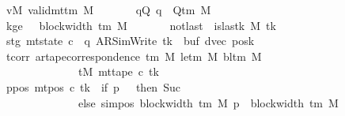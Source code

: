 \begin{isabellebody}
\ \ \ \ \ \ \ vM{\isacharcolon}{\kern0pt}\ {\isachardoublequoteopen}valid{\isacharunderscore}{\kern0pt}mttm\ M{\isachardoublequoteclose}\isanewline
\ \ \ \ \ \ \ qQ{\isacharcolon}{\kern0pt}\ {\isachardoublequoteopen}q\ {\isasymin}\ Q{\isacharunderscore}{\kern0pt}tm\ M{\isachardoublequoteclose}\isanewline
\ \ \ \ \ \ \ kge{}{\isacharcolon}{\kern0pt}\ {\isachardoublequoteopen}{}\ {\isasymle}\ block{\isacharunderscore}{\kern0pt}width\ {\isacharparenleft}{\kern0pt}{\isasymGamma}{\isacharunderscore}{\kern0pt}tm\ M{\isacharparenright}{\kern0pt}{\isachardoublequoteclose}\isanewline
\ \ \ \ \ \ \ notlast{\isacharcolon}{\kern0pt}\ {\isachardoublequoteopen}{\isasymnot}\ is{\isacharunderscore}{\kern0pt}last{\isacharunderscore}{\kern0pt}k\ M\ tk{\isachardoublequoteclose}\isanewline
\ \ \ \ \ \ \ stg{\isacharcolon}{\kern0pt}\ {\isachardoublequoteopen}mt{\isacharunderscore}{\kern0pt}state\ c{\isacharprime}{\kern0pt}\ {\isacharequal}{\kern0pt}\ {\isacharparenleft}{\kern0pt}q{\isacharcomma}{\kern0pt}\ AR{\isacharunderscore}{\kern0pt}SimWrite{\isacharcomma}{\kern0pt}\ tk{\isacharcomma}{\kern0pt}\ {}{\isacharcomma}{\kern0pt}\ buf{\isacharcomma}{\kern0pt}\ dvec{\isacharcomma}{\kern0pt}\ posk{\isacharparenright}{\kern0pt}{\isachardoublequoteclose}\isanewline
\ \ \ \ \ \ \ tcorr{\isacharcolon}{\kern0pt}\ {\isachardoublequoteopen}ar{\isacharunderscore}{\kern0pt}tape{\isacharunderscore}{\kern0pt}correspondence\ {\isacharparenleft}{\kern0pt}{\isasymGamma}{\isacharunderscore}{\kern0pt}tm\ M{\isacharparenright}{\kern0pt}\ {\isacharparenleft}{\kern0pt}le{\isacharunderscore}{\kern0pt}tm\ M{\isacharparenright}{\kern0pt}\ {\isacharparenleft}{\kern0pt}bl{\isacharunderscore}{\kern0pt}tm\ M{\isacharparenright}{\kern0pt}\isanewline
\ \ \ \ \ \ \ \ \ \ \ \ \ \ \ \ \ \ \ \ tM\ {\isacharparenleft}{\kern0pt}mt{\isacharunderscore}{\kern0pt}tape\ c{\isacharprime}{\kern0pt}\ tk{\isacharparenright}{\kern0pt}{\isachardoublequoteclose}\isanewline
\ \ \ \ \ \ \ ppos{\isacharcolon}{\kern0pt}\ {\isachardoublequoteopen}mt{\isacharunderscore}{\kern0pt}pos\ c{\isacharprime}{\kern0pt}\ tk\ {\isacharequal}{\kern0pt}\ {\isacharparenleft}{\kern0pt}if\ p\ {\isacharequal}{\kern0pt}\ {}\ then\ Suc\ {}\isanewline
\ \ \ \ \ \ \ \ \ \ \ \ \ \ \ \ \ \ \ \ else\ sim{\isacharunderscore}{\kern0pt}pos\ {\isacharparenleft}{\kern0pt}block{\isacharunderscore}{\kern0pt}width\ {\isacharparenleft}{\kern0pt}{\isasymGamma}{\isacharunderscore}{\kern0pt}tm\ M{\isacharparenright}{\kern0pt}{\isacharparenright}{\kern0pt}\ p\ {\isacharplus}{\kern0pt}\ block{\isacharunderscore}{\kern0pt}width\ {\isacharparenleft}{\kern0pt}{\isasymGamma}{\isacharunderscore}{\kern0pt}tm\ M{\isacharparenright}{\kern0pt}{\isacharparenright}{\kern0pt}{\isachardoublequoteclose}\isanewline

\end{isabellebody}
